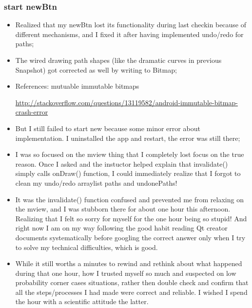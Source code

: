 \documentclass[9pt,b5paper]{article}
\begin{document}
\subsubsection{start newBtn}
\label{sec-5-2-2}
\begin{itemize}
\item Realized that my newBtn lost its functionality during last checkin because of different mechanisms, and I fixed it after having implemented undo/redo for paths;
\item The wired drawing path shapes (like the dramatic curves in previous Snapshot) got corrected as well by writing to Bitmap;
\item References: mutuable immutable bitmaps 

\url{http://stackoverflow.com/questions/13119582/android-immutable-bitmap-crash-error}
\item But I still failed to start new because some minor error about implementation. I uninstalled the app and restart, the error was still there;
\item I was so focused on the mview thing that I completely lost focus on the true reason. Once I asked and the instuctor helped explain that invalidate() simply calls onDraw() function, I could immediately realize that I forgot to clean my undo/redo arraylist paths and undonePaths!
\item It was the invalidate() function confused and prevented me from relaxing on the mview, and I was stubborn there for about one hour this afternoon. Realizing that I felt so sorry for myself for the one hour being so stupid! And right now I am on my way following the good habit reading Qt creator documents systematically before googling the correct answer only when I try to solve my technical difficulties, which is good.
\item While it still worths a minutes to rewind and rethink about what happened during that one hour, how I trusted myself so much and suspected on low probability corner cases situations, rather then double check and confirm that all the steps/processes I had made were correct and reliable. I wished I spend the hour with a scientific attitude the latter.
\end{itemize}
\end{document}
